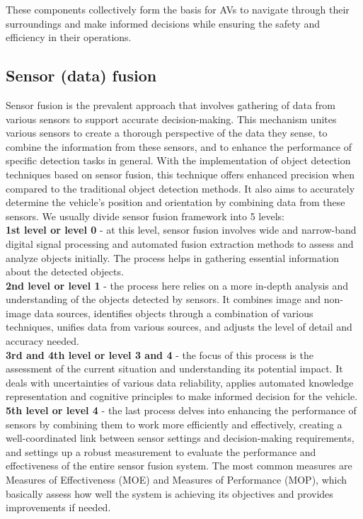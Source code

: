 \documentclass[10pt,oneside,english,a4paper]{article}
\begin{document}
\par These components collectively form the basis for AVs to navigate through their surroundings and make informed decisions while ensuring the safety and efficiency in their operations.

\subsection{Sensor (data) fusion} \label{fusion}

\indent Sensor fusion is the prevalent approach that involves gathering of data from various sensors to support accurate decision-making. This mechanism unites various sensors to create a thorough perspective of the data they sense, to combine the information from these sensors, and to enhance the performance of specific detection tasks in general. With the implementation of object detection techniques based on sensor fusion, this technique offers enhanced precision when compared to the traditional object detection methods. It also aims to accurately determine the vehicle's position and orientation by combining data from these sensors. We usually divide sensor fusion framework into 5 levels:\\
\indent \textbf{1st level or level 0} - at this level, sensor fusion involves wide and narrow-band digital signal processing and automated fusion extraction methods to assess and analyze objects initially. The process helps in gathering essential information about the detected objects.\\
\indent \textbf{2nd level or level 1} - the process here relies on a more in-depth analysis and understanding of the objects detected by sensors. It combines image and non-image data sources, identifies objects through a combination of various techniques, unifies data from various sources, and adjusts the level of detail and accuracy needed.\\ 
\indent \textbf{3rd and 4th level or level 3 and 4} - the focus of this process is the assessment of the current situation and understanding its potential impact. It deals with uncertainties of various data reliability, applies automated knowledge representation and cognitive principles to make informed decision for the vehicle.\\
\indent \textbf{5th level or level 4} - the last process delves into enhancing the performance of sensors by combining them to work more efficiently and effectively, creating a well-coordinated link between sensor settings and decision-making requirements, and settings up a robust measurement to evaluate the performance and effectiveness of the entire sensor fusion system. The most common measures are Measures of Effectiveness (MOE) and Measures of Performance (MOP), which basically assess how well the system is achieving its objectives and provides improvements if needed.
\cite{AIandIoT}\cite{stateoftheart}\cite{Sensorfusion}
\end{document}
